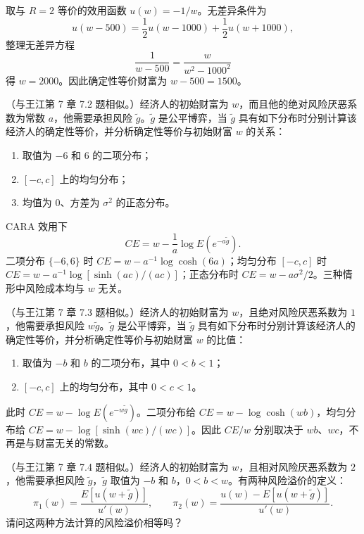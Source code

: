 \begin{solution}
取与 $R=2$ 等价的效用函数 $u(w)=-1/w$。无差异条件为
\[
u(w-500)=\frac12u(w-1000)+\frac12u(w+1000),
\]
整理无差异方程
\[
\frac1{w-500}=\frac{w}{w^2-1000^2}
\]
得 $w=2000$。因此确定性等价财富为 $w-500=1500$。
\end{solution}
\begin{problem}
（与王江第 7 章 7.2 题相似。）经济人的初始财富为 $w$，而且他的绝对风险厌恶系数为常数 $a$，他需要承担风险 $\tilde{g}$。$\tilde{g}$ 是公平博弈，当 $\tilde{g}$ 具有如下分布时分别计算该经济人的确定性等价，并分析确定性等价与初始财富 $w$ 的关系：
\begin{enumerate}[label=(\alph*)]
    \item 取值为 $-6$ 和 $6$ 的二项分布；
    \item $[-c,c]$ 上的均匀分布；
    \item 均值为 $0$、方差为 $\sigma^2$ 的正态分布。
\end{enumerate}
\end{problem}
\begin{solution}
CARA 效用下
\[
CE=w-\frac1a\log E(e^{-a\tilde g}).
\]
二项分布 $\{-6,6\}$ 时 $CE=w-a^{-1}\log\cosh(6a)$；均匀分布 $[-c,c]$ 时 $CE=w-a^{-1}\log[\sinh(ac)/(ac)]$；正态分布时 $CE=w-a\sigma^2/2$。三种情形中风险成本均与 $w$ 无关。
\end{solution}
\begin{problem}
（与王江第 7 章 7.3 题相似。）经济人的初始财富为 $w$，且绝对风险厌恶系数为 $1$，他需要承担风险 $w\tilde{g}$。$\tilde{g}$ 是公平博弈，当 $\tilde{g}$ 具有如下分布时分别计算该经济人的确定性等价，并分析确定性等价与初始财富 $w$ 的比值：
\begin{enumerate}[label=(\alph*)]
    \item 取值为 $-b$ 和 $b$ 的二项分布，其中 $0<b<1$；
    \item $[-c,c]$ 上的均匀分布，其中 $0<c<1$。
\end{enumerate}
\end{problem}
\begin{solution}
此时 $CE=w-\log E(e^{-w\tilde g})$。二项分布给 $CE=w-\log\cosh(wb)$，均匀分布给 $CE=w-\log[\sinh(wc)/(wc)]$。因此 $CE/w$ 分别取决于 $wb$、$wc$，不再是与财富无关的常数。
\end{solution}
\begin{problem}
（与王江第 7 章 7.4 题相似。）经济人的初始财富为 $w$，且相对风险厌恶系数为 $2$，他需要承担风险 $\tilde{g}$，$\tilde{g}$ 取值为 $-b$ 和 $b$，$0<b<w$。有两种风险溢价的定义：
\[
    \pi_1(w)=\frac{E[u(w+\tilde{g})]}{u'(w)},\qquad \pi_2(w)=\frac{u(w)-E[u(w+\tilde{g})]}{u'(w)}.
\]
请问这两种方法计算的风险溢价相等吗？
\end{problem}
